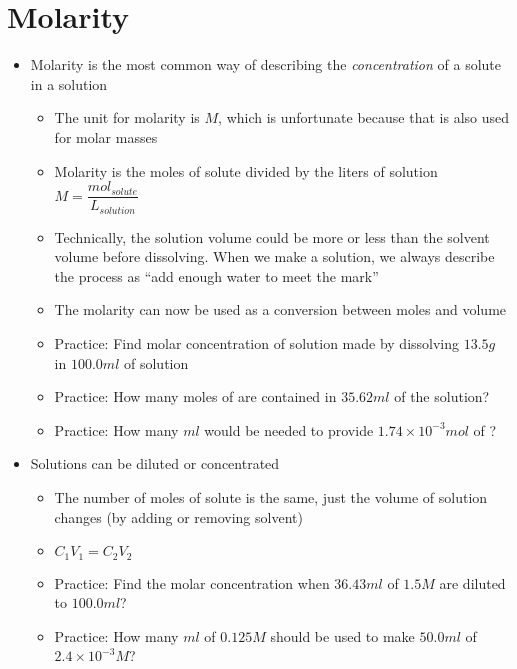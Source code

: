 \documentclass[12pt, openany, letterpaper]{memoir}
\begin{document}
\section{Molarity}
\begin{itemize}
  \item Molarity is the most common way of describing the \emph{concentration} of a solute in a solution
  \begin{itemize}
    \item The unit for molarity is $M$, which is unfortunate because that is also used for molar masses
    \item Molarity is the moles of solute divided by the liters of solution $M=\dfrac{mol_{solute}}{L_{solution}}$
    \item Technically, the solution volume could be more or less than the solvent volume before dissolving. When we make a solution, we always describe the process as ``add enough water to meet the mark''
    \item The molarity can now be used as a conversion between moles and volume
    \item Practice: Find molar concentration of solution made by dissolving $13.5g$  in $100.0ml$ of solution
    \item Practice: How many moles of  are contained in $35.62ml$ of the solution?
    \item Practice: How many $ml$ would be needed to provide $1.74\times10^{-3}mol$ of ?
  \end{itemize}
  \item Solutions can be diluted or concentrated
  \begin{itemize}
    \item The number of moles of solute is the same, just the volume of solution changes (by adding or removing solvent)
    \item $C_1V_1=C_2V_2$
    \item Practice: Find the molar concentration when $36.43ml$ of $1.5M$  are diluted to $100.0ml$?
    \item Practice: How many $ml$ of $0.125M$  should be used to make $50.0ml$ of $2.4\times10^{-3}M$?
  \end{itemize}
\end{itemize}
\end{document}
